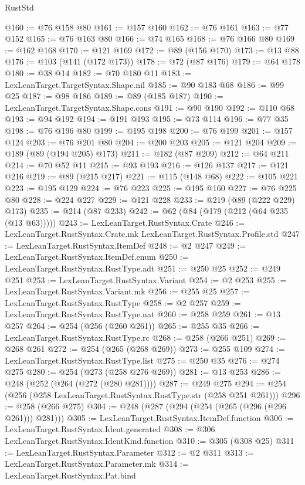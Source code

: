 \begin{lexlean}{RustStd}
\begin{coremodule}
@160 := @76 @158 @80
@161 := @157 @160
@162 := @76 @161
@163 := @77 @152
@165 := @76 @163 @80
@166 := @74 @165
@168 := @76 @166 @80
@169 := @162 @168
@170 := @121 @169
@172 := @89 (@156 @170)
@173 := @13 @88
@176 := @103 (@141 (@172 @173))
@178 := @72 (@87 @176)
@179 := @64 @178
@180 := @38 @14
@182 := @70 @180 @11
@183 := LexLeanTarget.TargetSyntax.Shape.nil
@185 := @90 @183 @68
@186 := @99 @25
@187 := @98 @186
@189 := @89 (@185 @187)
@190 := LexLeanTarget.TargetSyntax.Shape.cons
@191 := @90 @190
@192 := @110 @68
@193 := @94 @192
@194 := @191 @193
@195 := @73 @114
@196 := @77 @35
@198 := @76 @196 @80
@199 := @195 @198
@200 := @76 @199
@201 := @157 @124
@203 := @76 @201 @80
@204 := @200 @203
@205 := @121 @204
@209 := @189 (@89 (@194 @205) @173)
@211 := @182 (@87 @209)
@212 := @64 @211
@214 := @70 @52 @11
@215 := @93 @193
@216 := @126 @137
@217 := @121 @216
@219 := @89 (@215 @217)
@221 := @115 (@148 @68)
@222 := @105 @221
@223 := @195 @129
@224 := @76 @223
@225 := @195 @160
@227 := @76 @225 @80
@228 := @224 @227
@229 := @121 @228
@233 := @219 (@89 (@222 @229) @173)
@235 := @214 (@87 @233)
@242 := @62 (@84 (@179 (@212 (@64 @235 (@13 @63)))))
@243 := LexLeanTarget.RustSyntax.Crate
@246 := LexLeanTarget.RustSyntax.Crate.mk LexLeanTarget.RustSyntax.Profile.std
@247 := LexLeanTarget.RustSyntax.ItemDef
@248 := @2 @247
@249 := LexLeanTarget.RustSyntax.ItemDef.enum
@250 := LexLeanTarget.RustSyntax.RustType.adt
@251 := @250 @25
@252 := @249 @251
@253 := LexLeanTarget.RustSyntax.Variant
@254 := @2 @253
@255 := LexLeanTarget.RustSyntax.Variant.mk
@256 := @255 @25
@257 := LexLeanTarget.RustSyntax.RustType
@258 := @2 @257
@259 := LexLeanTarget.RustSyntax.RustType.nat
@260 := @258 @259
@261 := @13 @257
@264 := @254 (@256 (@260 @261))
@265 := @255 @35
@266 := LexLeanTarget.RustSyntax.RustType.rc
@268 := @258 (@266 @251)
@269 := @268 @261
@272 := @254 (@265 (@268 @269))
@273 := @255 @109
@274 := LexLeanTarget.RustSyntax.RustType.list
@275 := @250 @35
@276 := @274 @275
@280 := @254 (@273 (@258 @276 @269))
@281 := @13 @253
@286 := @248 (@252 (@264 (@272 (@280 @281))))
@287 := @249 @275
@294 := @254 (@256 (@258 LexLeanTarget.RustSyntax.RustType.str (@258 @251 @261)))
@296 := @258 (@266 @275)
@304 := @248 (@287 (@294 (@254 (@265 (@296 (@296 @261))) @281)))
@305 := LexLeanTarget.RustSyntax.ItemDef.function
@306 := LexLeanTarget.RustSyntax.Ident.generated
@308 := @306 LexLeanTarget.RustSyntax.IdentKind.function
@310 := @305 (@308 @25)
@311 := LexLeanTarget.RustSyntax.Parameter
@312 := @2 @311
@313 := LexLeanTarget.RustSyntax.Parameter.mk
@314 := LexLeanTarget.RustSyntax.Pat.bind

\end{coremodule}
\end{lexlean}
